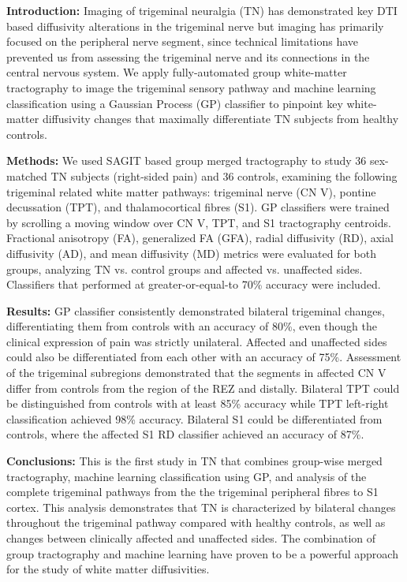 \textbf{Introduction:}  Imaging of trigeminal neuralgia (TN) has demonstrated key DTI based diffusivity alterations in the trigeminal nerve but imaging has primarily focused on the peripheral nerve segment, since technical limitations have  prevented us from assessing the trigeminal nerve and its connections in the central nervous system. We apply fully-automated group white-matter tractography to image the trigeminal sensory pathway and machine learning classification using a Gaussian Process (GP) classifier to pinpoint key white-matter diffusivity changes that maximally differentiate TN subjects from healthy controls. 

\textbf{Methods:} We used SAGIT based group merged tractography to study 36 sex-matched TN subjects (right-sided pain) and 36 controls, examining the following trigeminal related white matter pathways: trigeminal nerve (CN V), pontine decussation (TPT), and thalamocortical fibres (S1). GP classifiers were trained by scrolling a moving window over CN V, TPT, and S1 tractography centroids. Fractional anisotropy (FA), generalized FA (GFA), radial diffusivity (RD), axial diffusivity (AD), and mean diffusivity (MD) metrics were evaluated for both groups, analyzing TN vs. control groups and affected vs. unaffected sides. Classifiers that performed at greater-or-equal-to 70\% accuracy were included.

\textbf{Results:} GP classifier consistently demonstrated bilateral trigeminal changes, differentiating them from controls with an accuracy of 80\%, even though the clinical expression of pain was strictly unilateral. Affected and unaffected sides could also be differentiated from each other with an accuracy of 75\%. Assessment of the trigeminal subregions demonstrated that the segments in affected CN V differ from controls from the region of the REZ and distally. Bilateral TPT could be distinguished from controls with at least 85\% accuracy while TPT left-right classification achieved 98\% accuracy. Bilateral S1 could be differentiated from controls, where the affected S1 RD classifier achieved an accuracy of 87\%.

\textbf{Conclusions:} This is the first study in TN that combines group-wise merged tractography, machine learning classification using GP, and analysis of the complete trigeminal pathways from the the trigeminal peripheral fibres to S1 cortex. This analysis demonstrates that TN is characterized by bilateral changes throughout the trigeminal pathway compared with healthy controls, as well as changes between clinically affected and unaffected sides. The combination of group tractography and machine learning have proven to be a powerful approach for the study of white matter diffusivities.